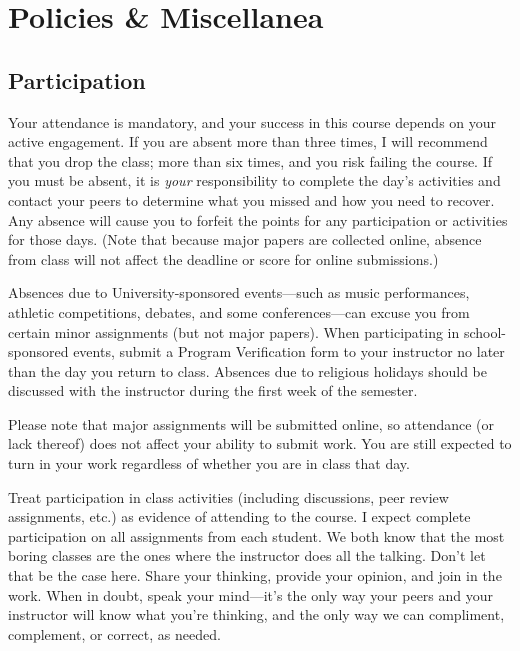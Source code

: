 \documentclass[11pt,oneside]{amsart}	%
\begin{document}
 

\section{Policies \& Miscellanea}

\subsection{Participation}
Your attendance is mandatory, and your success in this course depends on your active engagement.  If you are absent more than three times, I will recommend that you drop the class; more than six times, and you risk failing the course.  If you must be absent, it is \emph{your} responsibility to complete the day's activities and contact your peers to determine what you missed and how you need to recover. Any absence will cause you to forfeit the points for any participation or activities for those days. (Note that because major papers are collected online, absence from class will not affect the deadline or score for online submissions.)

Absences due to University-sponsored events---such as music performances, athletic competitions, debates, and some conferences---can excuse you from certain minor assignments (but not major papers). When participating in school-sponsored events, submit a Program Verification form to your instructor no later than the day you return to class. Absences due to religious holidays should be discussed with the instructor during the first week of the semester.

Please note that major assignments will be submitted online, so attendance (or lack thereof) does not affect your ability to submit work. You are still expected to turn in your work regardless of whether you are in class that day.

Treat participation in class activities (including discussions, peer review assignments, etc.) as evidence of attending to the course. I expect complete participation on all assignments from each student. We both know that the most boring classes are the ones where the instructor does all the talking. Don't let that be the case here. Share your thinking, provide your opinion, and join in the work. When in doubt, speak your mind---it's the only way your peers and your instructor will know what you're thinking, and the only way we can compliment, complement, or correct, as needed.
\end{document}
